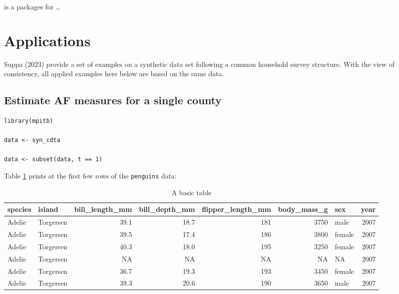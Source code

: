  is a packages for \ldots{}

\hypertarget{applications}{%
\section{Applications}\label{applications}}

Suppa (2023) provide a set of examples on a synthetic data set following a common household survey structure. With the view of consistency, all applied examples here below are based on the same data.

\hypertarget{estimate-af-measures-for-a-single-county}{%
\subsection{Estimate AF measures for a single county}\label{estimate-af-measures-for-a-single-county}}

\begin{verbatim}
library(mpitb)

data <- syn_cdta

data <- subset(data, t == 1)
\end{verbatim}

Table \ref{tab:penguins-tab-static} prints at the first few rows of the \texttt{penguins} data:

\begin{table}

\caption{\label{tab:penguins-tab-static}A basic table}
\centering
\fontsize{7}{9}\selectfont
\begin{tabular}[t]{l|l|r|r|r|r|l|r}
\hline
species & island & bill\_length\_mm & bill\_depth\_mm & flipper\_length\_mm & body\_mass\_g & sex & year\\
\hline
Adelie & Torgersen & 39.1 & 18.7 & 181 & 3750 & male & 2007\\
\hline
Adelie & Torgersen & 39.5 & 17.4 & 186 & 3800 & female & 2007\\
\hline
Adelie & Torgersen & 40.3 & 18.0 & 195 & 3250 & female & 2007\\
\hline
Adelie & Torgersen & NA & NA & NA & NA & NA & 2007\\
\hline
Adelie & Torgersen & 36.7 & 19.3 & 193 & 3450 & female & 2007\\
\hline
Adelie & Torgersen & 39.3 & 20.6 & 190 & 3650 & male & 2007\\
\hline
\end{tabular}
\end{table}

